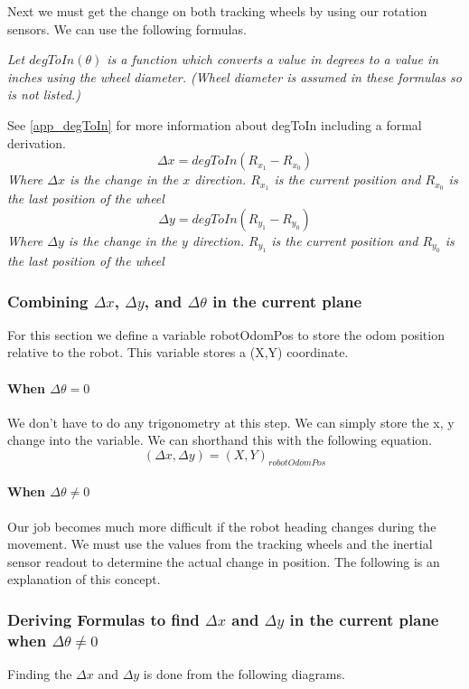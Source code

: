\documentclass[12pt]{report}
\begin{document}
Next we must get the change on both tracking wheels by using our rotation sensors.
We can use the following formulas.

\textit{Let $degToIn(\theta)$ is a function which converts a value in degrees to a value in inches using the wheel diameter. (Wheel diameter is assumed in these formulas so is not listed.)}

See \ref{app_degToIn} for more information about degToIn including a formal derivation.
$$
    \Delta x = degToIn(R_{x_1} - R_{x_0})
$$
\textit{Where $\Delta x$ is the change in the $x$ direction. $R_{x_1}$ is the current position and $R_{x_0}$ is the last position of the wheel}
$$
    \Delta y = degToIn(R_{y_1} - R_{y_0})
$$
\textit{Where $\Delta y$ is the change in the $y$ direction. $R_{y_1}$ is the current position and $R_{y_0}$ is the last position of the wheel}

\subsubsection{Combining $\Delta x$, $\Delta y$, and $\Delta\theta$ in the current plane}
    For this section we define a variable robotOdomPos to store the odom position relative to the robot.
    This variable stores a (X,Y) coordinate.
\paragraph{When $\Delta\theta = 0$}
    We don't have to do any trigonometry at this step.
    We can simply store the x, y change into the variable.
    We can shorthand this with the following equation.
    $$ (\Delta x, \Delta y) = (X,Y)_{robotOdomPos} $$
\paragraph{When $\Delta\theta \neq 0$}\label{deltaneqtheta}
Our job becomes much more difficult if the robot heading changes during the movement.
We must use the values from the tracking wheels and the inertial sensor readout to determine the actual change in position.
The following is an explanation of this concept.

\subsubsection{Deriving Formulas to find $\Delta x$ and $\Delta y$ in the current plane when $\Delta\theta \neq 0$} \label{app_trighell}

Finding the $\Delta x$ and $\Delta y$ is done from the following diagrams.
\end{document}
